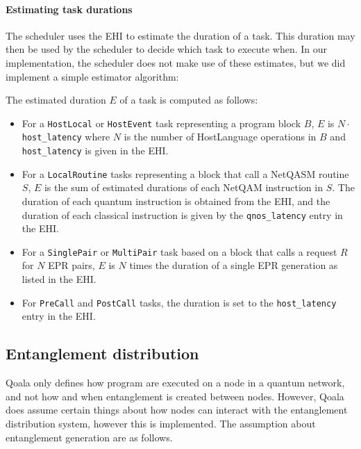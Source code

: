 \paragraph{Estimating task durations}
The scheduler uses the EHI to estimate the duration of a task.
This duration may then be used by the scheduler to decide which task to execute when.
In our implementation, the scheduler does not make use of these estimates, but we did implement a simple estimator algorithm:

The estimated duration $E$ of a task is computed as follows:
\begin{itemize}
    \item For a \texttt{HostLocal} or \texttt{HostEvent} task representing a program block $B$, $E$ is $N \cdot$ \texttt{host\_latency} where $N$ is the number of HostLanguage operations in $B$ and \texttt{host\_latency} is given in the EHI.
    \item For a \texttt{LocalRoutine} tasks representing a block that call a NetQASM routine $S$, 
        $E$ is the sum of estimated durations of each NetQAM instruction in $S$. The duration of each quantum instruction is obtained from the EHI, and the duration of each classical instruction is given by the \texttt{qnos\_latency} entry in the EHI.
    \item For a \texttt{SinglePair} or \texttt{MultiPair} task based on a block that calls a request $R$ for $N$ EPR pairs, $E$ is $N$ times the duration of a single EPR generation as listed in the EHI.
    \item For \texttt{PreCall} and \texttt{PostCall} tasks, the duration is set to the \texttt{host\_latency} entry in the EHI.
\end{itemize}






\subsection{Entanglement distribution}
\label{qoala:sec:app:entanglement_distribution}
Qoala only defines how program are executed on a node in a quantum network,
and not how and when entanglement is created between nodes.
However, Qoala does assume certain things about how nodes can interact with the entanglement distribution system, however this is implemented.
The assumption about entanglement generation are as follows.

